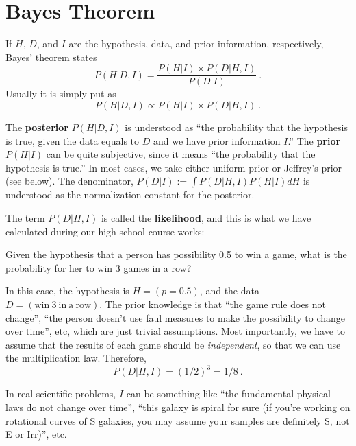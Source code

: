 \section{Bayes Theorem}
\begin{thm}
If $H$, $D$, and $I$ are the hypothesis, data, and prior information, respectively, Bayes' theorem states 
\begin{equation}\label{eq: bayes thm}
  P(H | D, I) = \frac{P(H|I) \times P(D|H, I)}{P(D|I)} ~.
\end{equation}
Usually it is simply put as 
\begin{equation}\label{eq: bayes thm propto}
  P(H | D, I) \propto P(H|I) \times P(D|H, I) ~.
\end{equation}
\end{thm}
The \textbf{posterior} $P(H|D, I)$ is understood as ``the probability that the hypothesis is true, given the data equals to $D$ and we have prior information $I$.'' The \textbf{prior} $P(H|I)$ can be quite subjective, since it means ``the probability that the hypothesis is true.'' In most cases, we take either uniform prior or Jeffrey's prior (see below). The denominator, $P(D | I)  := \int P(D | H, I) P(H|I) dH$ is understood as the normalization constant for the posterior. 

The term $P(D|H, I)$ is called the \textbf{likelihood}, and this is what we have calculated during our high school course works: 

\begin{ex}
Given the hypothesis that a person has possibility 0.5 to win a game, what is the probability for her to win 3 games in a row?

In this case, the hypothesis is $H = (p=0.5)$, and the data $D = (\mathrm{win~3~in~a~row})$. The prior knowledge is that ``the game rule does not change'', ``the person doesn't use faul measures to make the possibility to change over time'', etc, which are just trivial assumptions. Most importantly, we have to assume that the results of each game should be \textit{independent}, so that we can use the multiplication law. Therefore,
\begin{equation*}
  P(D|H, I) = (1/2)^3 = 1/8 ~.
\end{equation*}

In real scientific problems, $I$ can be something like ``the fundamental physical laws do not change over time'', ``this galaxy is spiral for sure (if you're working on rotational curves of S galaxies, you may assume your samples are definitely S, not E or Irr)'', etc.
\end{ex}

